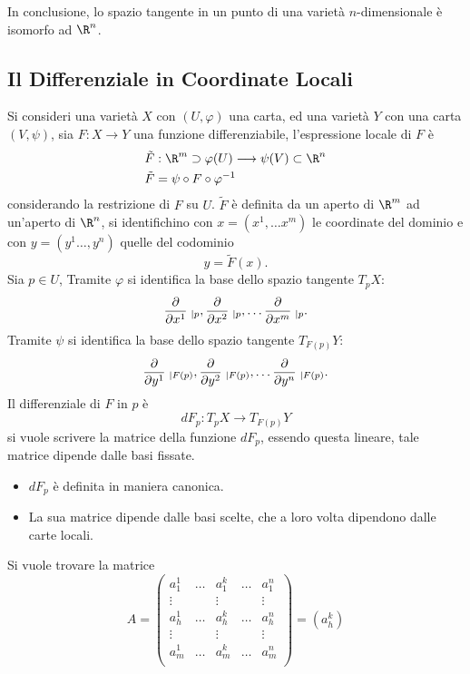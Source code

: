 \documentclass[10pt, letterpaper]{report}
\begin{document}
\noindent In conclusione, lo spazio tangente in un punto di una varietà $n$-dimensionale è isomorfo ad $\R^n$.
\subsection{Il Differenziale in Coordinate Locali}
Si consideri una varietà $X$ con $(U,\varphi)$ una carta, ed una varietà $Y$ con una carta $(V,\psi)$, sia $F:X\rightarrow Y$ una funzione differenziabile, l'espressione locale di $F$ è \begin{align}
    &\tilde F:\R^m\supset\varphi(U)\longrightarrow\psi(V)\subset\R^n\\
    &\tilde F = \psi\circ F\circ \varphi^{-1}
\end{align}
considerando la restrizione di $F$ su $U$.
$\tilde F$ è definita da un aperto di $\R^m$ ad un'aperto di $\R^n$, si identifichino con $x=(x^1,\dots x^m)$ le coordinate del dominio e con $y=(y^1\dots, y^n)$ quelle del codominio\begin{equation}
    y=\tilde F(x).
\end{equation}
Sia $p\in U$, Tramite $\varphi$ si identifica la base dello spazio tangente $T_pX$:\begin{equation}
    \frac{\partial}{\partial x^1}\hphantom{.}_{|p},
        \frac{\partial}{\partial x^2}\hphantom{.}_{|p},\dots
        \frac{\partial}{\partial x^m}\hphantom{.}_{|p}.
\end{equation}
Tramite $\psi$ si identifica la base dello spazio tangente $T_{F(p)}Y$:\begin{equation}
    \frac{\partial}{\partial y^1}\hphantom{.}_{|F(p)},
        \frac{\partial}{\partial y^2}\hphantom{.}_{|F(p)},\dots
        \frac{\partial}{\partial y^n}\hphantom{.}_{|F(p)}.
\end{equation}
Il differenziale di $F$ in $p$ è \begin{equation}
    dF_p:T_pX\rightarrow T_{F(p)}Y
\end{equation}
si vuole scrivere la matrice della funzione $dF_p$, essendo questa lineare, tale matrice dipende dalle basi fissate.\begin{itemize}
    \item $dF_p$ è definita in maniera canonica.
    \item La sua matrice dipende dalle basi scelte, che a loro volta dipendono dalle carte locali.
\end{itemize}
Si vuole trovare la matrice\begin{equation}A=\begin{pmatrix}
a^1_1&\dots & a^k_1&\dots &a^n_1\\
\vdots& & \vdots&&\vdots\\ 
a^1_h&\dots & a^k_h&\dots &a^n_h\\
\vdots& & \vdots&&\vdots\\ 
a^1_m&\dots & a^k_m&\dots &a^n_m\\
\end{pmatrix}=(a^k_h)\end{equation}
\end{document}
